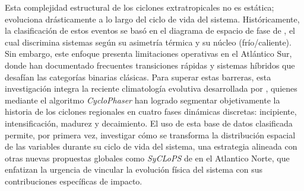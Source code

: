 
Esta complejidad estructural de los ciclones extratropicales no es estática; evoluciona drásticamente a lo largo del ciclo de vida del sistema. Históricamente, la clasificación de estos eventos se basó en el diagrama de espacio de fase de \citet{hart2003cyclone}, el cual discrimina sistemas según su asimetría térmica y su núcleo (frío/caliente).
Sin embargo, este enfoque presenta limitaciones operativas en el Atlántico Sur, donde \citet{reboita2022from} han documentado frecuentes transiciones rápidas y sistemas híbridos que desafían las categorías binarias clásicas.
Para superar estas barreras, esta investigación integra la reciente climatología evolutiva desarrollada por \citet{coutodesouza2024new}, quienes mediante el algoritmo \textit{CycloPhaser} han logrado segmentar objetivamente la historia de los ciclones regionales en cuatro fases dinámicas discretas: incipiente, intensificación, madurez y decaimiento.
El uso de esta base de datos clasificada permite, por primera vez, investigar cómo se transforma la distribución espacial de las variables durante su ciclo de vida del sistema, una estrategia alineada con otras nuevas propuestas globales como \textit{SyCLoPS} de \citet{han2025system} en el Atlantico Norte, que enfatizan la urgencia de vincular la evolución física del sistema con sus contribuciones específicas de impacto.


